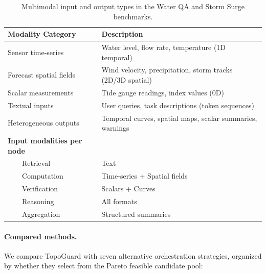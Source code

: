 \documentclass[manuscript,review,anonymous]{acmart}
\begin{document}
\begin{table}[t]
\centering
\caption{Multimodal input and output types in the Water QA and Storm Surge benchmarks.}
\label{tab:multimodal_stats}
\small
\begin{tabular}{ll}
\toprule
\textbf{Modality Category} & \textbf{Description} \\
\midrule
Sensor time-series & Water level, flow rate, temperature (1D temporal) \\
Forecast spatial fields & Wind velocity, precipitation, storm tracks (2D/3D spatial) \\
Scalar measurements & Tide gauge readings, index values (0D) \\
Textual inputs & User queries, task descriptions (token sequences) \\
Heterogeneous outputs & Temporal curves, spatial maps, scalar summaries, warnings \\
\midrule
\textbf{Input modalities per node} & \\
~~~~Retrieval & Text \\
~~~~Computation & Time-series + Spatial fields \\
~~~~Verification & Scalars + Curves \\
~~~~Reasoning & All formats \\
~~~~Aggregation & Structured summaries \\
\bottomrule
\end{tabular}
\end{table}

\paragraph{Compared methods.}
We compare TopoGuard with seven alternative orchestration strategies, organized by whether they select from the Pareto feasible candidate pool:
\end{document}
